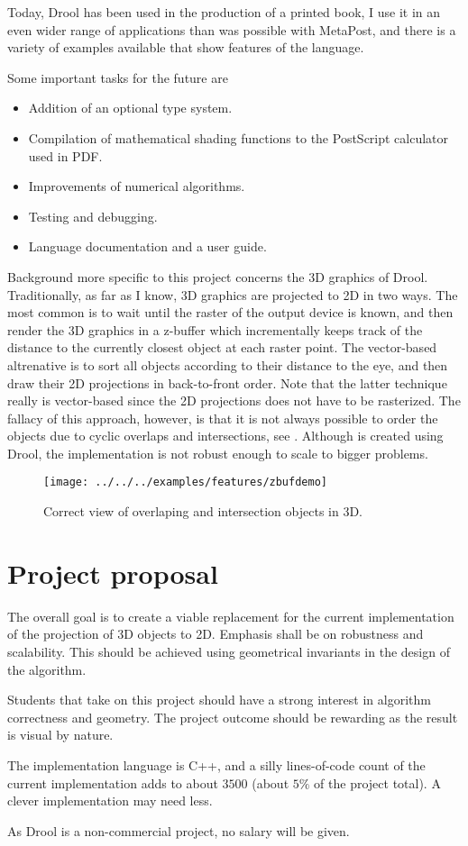 \documentclass[a4paper]{article}
\begin{document}
Today, Drool has been used in the production of a printed book, I use it in an even wider range of applications than was possible with MetaPost, and there is a variety of examples available that show features of the language.

Some important tasks for the future are
\begin{itemize}
\item Addition of an optional type system.
\item Compilation of mathematical shading functions to the PostScript calculator used in PDF.
\item Improvements of numerical algorithms.
\item Testing and debugging.
\item Language documentation and a user guide.
\end{itemize}

Background more specific to this project concerns the 3D graphics of Drool.  Traditionally, as far as I know, 3D graphics are projected to 2D in two ways.  The most common is to wait until the raster of the output device is known, and then render the 3D graphics in a z-buffer which incrementally keeps track of the distance to the currently closest object at each raster point.  The vector-based altrenative is to sort all objects according to their distance to the eye, and then draw their 2D projections in back-to-front order.  Note that the latter technique really is vector-based since the 2D projections does not have to be rasterized.  The fallacy of this approach, however, is that it is not always possible to order the objects due to cyclic overlaps and intersections, see .  Although  is created using Drool, the implementation is not robust enough to scale to bigger problems.

\begin{figure}[tb]
  \centering
  \texttt{[image: ../../../examples/features/zbufdemo]}
  \caption{Correct view of overlaping and intersection objects in 3D.}
\end{figure}

\section*{Project proposal}%
%
The overall goal is to create a viable replacement for the current implementation of the projection of 3D objects to 2D.  Emphasis shall be on robustness and scalability.  This should be achieved using geometrical invariants in the design of the algorithm.

Students that take on this project should have a strong interest in algorithm correctness and geometry.  The project outcome should be rewarding as the result is visual by nature.

The implementation language is C++, and a silly lines-of-code count of the current implementation adds to about $3500$ (about $5\%$ of the project total).  A clever implementation may need less.

As Drool is a non-commercial project, no salary will be given.



\end{document}
